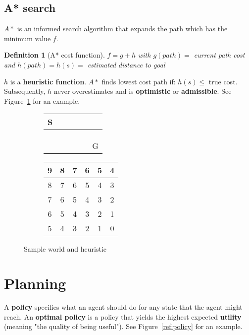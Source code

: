 \documentclass{report}
\newtheorem{definition}{Definition}[section]
\begin{document}
\section{A* search}
$A*$ is an informed search algorithm that expands the path which has the minimum value $f$.

\begin{definition}[A* cost function]
$f = g + h$ with $g(path) =$ current path cost and $h(path) = h(s) =$ estimated distance to goal
\end{definition}

$h$ is a {\bf heuristic function}. $A*$ finds lowest cost path if: $h(s) \le $ true cost. Subsequently, $h$ never overestimates and is {\bf optimistic} or {\bf admissible}. See Figure~\ref{ref:heuristic} for an example.

\begin{figure}[h!]
\centering
\begin{subfigure}[b]{0.3\textwidth}
\begin{tabular}{|c|c|c|c|c|c|}
\hline
S &\cellcolor{black}&&&& \\
\hline
&\cellcolor{black}&&&& \\
\hline
&\cellcolor{black}&&&& \\
\hline
&\cellcolor{black}&&&& \\
\hline
&&&&&G \\
\hline
\end{tabular}
\end{subfigure}
\begin{subfigure}[b]{0.3\textwidth}
\begin{tabular}{|c|c|c|c|c|c|}
\hline
9&8&7&6&5&4 \\
\hline
8&7&6&5&4&3 \\
\hline
7&6&5&4&3&2 \\
\hline
6&5&4&3&2&1 \\
\hline
5&4&3&2&1&0 \\
\hline
\end{tabular}
\end{subfigure}
\caption{Sample world and heuristic}
\label{ref:heuristic}
\end{figure}



\chapter{Planning}
\label{ref:chapterplanning}
A {\bf policy} specifies what an agent should do for any state that the agent might reach. An {\bf optimal policy} is a policy that yields the highest expected {\bf utility} (meaning "the quality of being useful"). See Figure~\ref{ref:policy} for an example.
\end{document}
